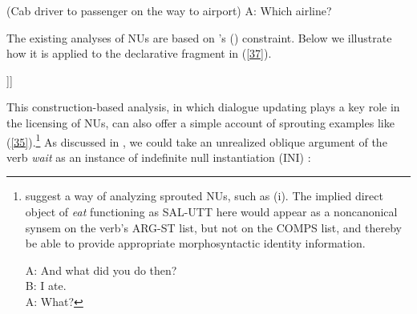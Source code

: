 \documentclass[output=paper
                ,modfonts
                ,nonflat
	        ,collection
	        ,collectionchapter
	        ,collectiontoclongg
 	        ,biblatex
                ,babelshorthands
                ,newtxmath
                ,draftmode
                ,colorlinks, citecolor=brown
]{./langsci/langscibook}
\begin{document}
{\ea (Cab driver to passenger on the way to airport) A: Which airline?\label{40}\z

The existing analyses of NUs \citep{Ginzburg2012, Sag2011, Kim2015, Abeille2014, Abeille2017} are based on \citeauthor{Ginzburg2000}'s (\citeyear{Ginzburg2000}) constraint. Below we illustrate how it is applied to the declarative fragment in (\ref{37}).

\ea\label{41}
\begin{forest}
[\begin{avm}\avml \hfil S\\
\[CAT &\[HEAD v\]\\
 CTXT & \[MAX-QUD $\lambda$\{$\pi$$^{i}$\}\[{\it break}({\it b,i})\]\\
  SAL-UTT \{\[CAT\ \@2\\
                          CONT & \[IND & {\it i}\\
                                 \] \]\}\]\]  \avmr \end{avm}
[\begin{avm}\avml \hfil NP\\
             \[CAT  \@2\\
  CONT & \[IND & {\it i}%
   \]\]\avmr\end{avm}
 [The mike]]]
\end{forest}
\z

This construction-based analysis, in which dialogue updating plays
a key role in the licensing of NUs, can also offer a simple account of
sprouting examples like (\ref{35}).\footnote{\citet[330]{Ginzburg2000} suggest a way of analyzing sprouted NUs, such as (i). The implied direct object of {\it eat} functioning as SAL-UTT here would appear as a noncanonical synsem on the verb's ARG-ST list, but not on the COMPS list, and thereby be able to provide appropriate morphosyntactic identity information.
	
	\ea  A: And what did you do then? \\B: I ate. \\A: What?\z
	
	
} As discussed in \citet{Kim2015}, we could take an unrealized oblique argument of
the verb {\it wait} as an instance of indefinite null instantiation (INI) \citep[see][]{Ruppenhofer2014}:

}
\end{document}
